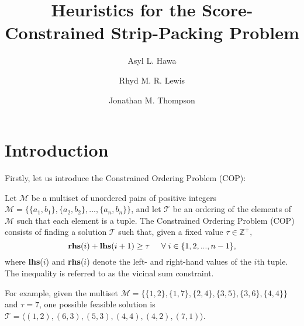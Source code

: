 \documentclass[oribibl]{llncs}
\begin{document}
	
\title{Heuristics for the Score-Constrained Strip-Packing Problem}
\author{Asyl L. Hawa \and Rhyd M. R. Lewis \and Jonathan M. Thompson}
\maketitle

\begin{abstract}
\end{abstract}

\section{Introduction}
\label{sec:intro}
Firstly, let us introduce the Constrained Ordering Problem (COP):

\begin{definition}
	\label{defn:cop}
	Let $\mathcal{M}$ be a multiset of unordered pairs of positive integers $\mathcal{M} = \{\{a_1, b_1\}, \{a_2,b_2\},...,\{a_n,b_n\}\}$, and let $\mathcal{T}$ be an ordering of the elements of $\mathcal{M}$ such that each element is a tuple. The Constrained Ordering Problem (COP) consists of finding a solution $\mathcal{T}$ such that, given a fixed value $\tau \in \mathbb{Z}^{+},$
	\begin{equation}
		\label{eqn:vsc}
		\textup{\textbf{rhs}}(i) + \textup{\textbf{lhs}}(i+1) \geq \tau \hspace{5mm} \forall \hspace{1mm} i \in \{1,2,..., n-1\},
	\end{equation}
	where \textup{\textbf{lhs}($i$)} and \textup{\textbf{rhs}($i$)} denote the left- and right-hand values of the $i$th tuple. The inequality is referred to as the \textup{vicinal sum constraint}.
\end{definition}

For example, given the multiset $\mathcal{M} = \{\{1,2\}, \{1,7\}, \{2,4\}, \{3,5\}, \{3,6\}, \{4,4\}\}$ and $\tau = 7$, one possible feasible solution is $\mathcal{T} = \langle(1,2), (6,3), (5,3), (4,4), (4,2), (7,1) \rangle$.
\end{document}
